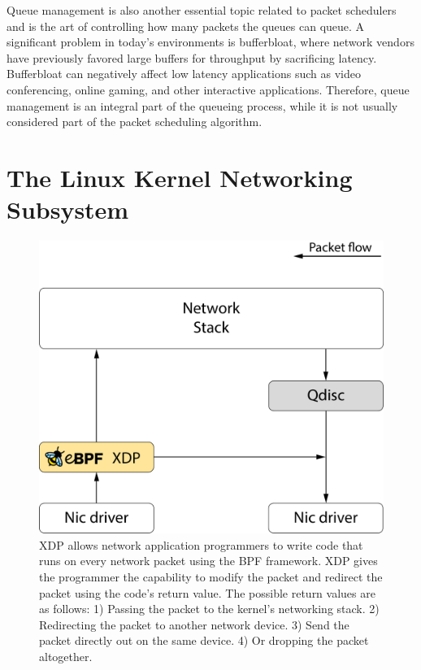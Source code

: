 \documentclass[sigconf, nonacm]{acmart}
\begin{document}
Queue management is also another essential topic related to packet schedulers and is the art of controlling how many packets the queues can queue. A significant problem in today's environments is bufferbloat, where network vendors have previously favored large buffers for throughput by sacrificing latency. Bufferbloat can negatively affect low latency applications such as video conferencing, online gaming, and other interactive applications. Therefore, queue management is an integral part of the queueing process, while it is not usually considered part of the packet scheduling algorithm.


\section{The Linux Kernel Networking Subsystem}

\begin{figure}
  \includegraphics[width=0.6\linewidth]{network-overview.pdf}
  \caption{XDP allows network application programmers to write code that runs on every network packet using the BPF framework. XDP gives the programmer the capability to modify the packet and redirect the packet using the code's return value. The possible return values are as follows: 1) Passing the packet to the kernel's networking stack. 2) Redirecting the packet to another network device. 3) Send the packet directly out on the same device. 4) Or dropping the packet altogether.}
  \label{fig:network_overview}
\end{figure}
\end{document}

